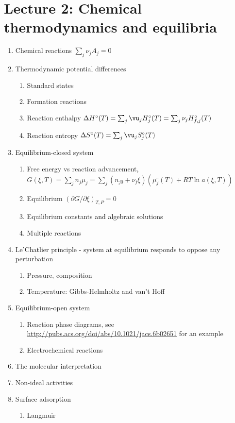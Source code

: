 \documentclass[11pt]{article}
\begin{document}
\section{Lecture 2: Chemical thermodynamics and equilibria}
\label{sec:orgb5d25fd}
\begin{enumerate}
\item Chemical reactions \(\sum_j \nu_j A_j = 0\)
\item Thermodynamic potential differences
\begin{enumerate}
\item Standard states
\item Formation reactions
\item Reaction enthalpy \(\Delta H^\circ (T) = \sum_j \vu_j H^\circ_j (T) = \sum_j \nu_j H^\circ_{f,j}(T)\)
\item Reaction entropy \(\Delta S^\circ (T) =  \sum_j \vu_j S^\circ_j (T)\)
\end{enumerate}
\item Equilibrium-closed system
\begin{enumerate}
\item Free energy vs reaction advancement, \(G(\xi,T) = \sum_j n_j\mu_j = \sum_j \left (n_{j0} + \nu_j \xi \right ) \left (\mu_j^\circ(T) + RT \ln a(\xi,T) \right )\)
\item Equilibrium \((\partial G / \partial \xi)_{T,P} = 0\)
\item Equilibrium constants and algebraic solutions
\item Multiple reactions
\end{enumerate}
\item Le'Chatlier principle - system at equilibrium responds to oppose any perturbation
\begin{enumerate}
\item Pressure, composition
\item Temperature: Gibbs-Helmholtz and van't Hoff
\end{enumerate}
\item Equilibrium-open system
\begin{enumerate}
\item Reaction phase diagrams, see \url{http://pubs.acs.org/doi/abs/10.1021/jacs.6b02651} for an example
\item Electrochemical reactions
\end{enumerate}
\item The molecular interpretation
\item Non-ideal activities
\item Surface adsorption
\begin{enumerate}
\item Langmuir
\end{enumerate}
\end{enumerate}
\end{document}
